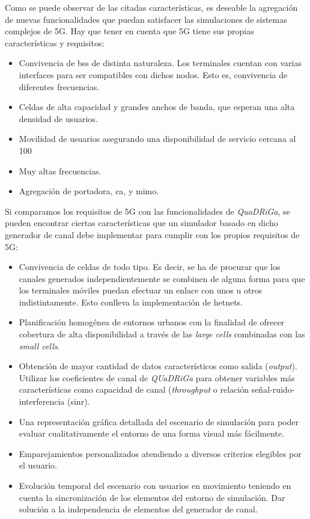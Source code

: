 Como se puede observar de las citadas características, es deseable la agregación de nuevas funcionalidades que puedan satisfacer las simulaciones de sistemas complejos de 5G. Hay que tener en cuenta que 5G tiene sus propias características y requisitos:

\begin{itemize}
    \item Convivencia de \acs{bs}s de distinta naturaleza. Los terminales cuentan con varias interfaces para ser compatibles con dichos nodos. Esto es, convivencia de diferentes frecuencias.
    \item Celdas de alta capacidad y grandes anchos de banda, que esperan una alta densidad de usuarios.
    \item Movilidad de usuarios asegurando una disponibilidad de servicio cercana al 100%
    \item Muy altas frecuencias.
    \item Agregación de portadora, \ac{ca}, y \acs{mimo}.
\end{itemize}

Si comparamos los requisitos de 5G con las funcionalidades de \textit{QuaDRiGa}, se pueden encontrar ciertas características que un simulador basado en dicho generador de canal debe implementar para cumplir con los propios requisitos de 5G:

\begin{itemize}
    \item Convivencia de celdas de todo tipo. Es decir, se ha de procurar que los canales generados independientemente se combinen de alguna forma para que los terminales móviles puedan efectuar un enlace con unos u otros indistintamente. Esto conlleva la implementación de \acs{hetnet}s.
    \item Planificación homogénea de entornos urbanos con la finalidad de ofrecer cobertura de alta disponibilidad a través de las \textit{large cells} combinadas con las \textit{small cells}.
    \item Obtención de mayor cantidad de datos característicos como salida (\textit{output}). Utilizar los coeficientes de canal de \textit{QUaDRiGa} para obtener variables más características como capacidad de canal (\textit{throughput} o relación señal-ruido-interferencia (\acs{sinr}).
    \item Una representación gráfica detallada del escenario de simulación para poder evaluar cualitativamente el entorno de una forma visual más fácilmente.
    \item Emparejamientos personalizados atendiendo a diversos criterios elegibles por el usuario.
    \item Evolución temporal del escenario con usuarios en movimiento teniendo en cuenta la sincronización de los elementos del entorno de simulación. Dar solución a la independencia de elementos del generador de canal.
\end{itemize}

